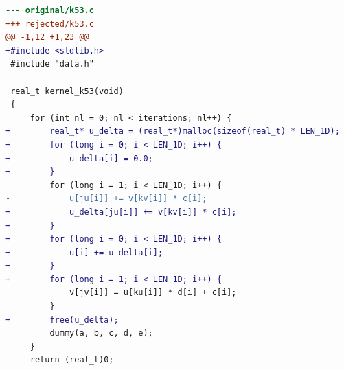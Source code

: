 \begin{lstlisting}[language=diff,basicstyle=\ttfamily\scriptsize,breaklines=true,caption={tsvc_c2/k53 — attempt 2 of 10, rejected by the gate at 'correctness': Program output changed — the patched program is NOT semantically equivalent to the original. / output differs and no numerical slack is in effect}]
--- original/k53.c
+++ rejected/k53.c
@@ -1,12 +1,23 @@
+#include <stdlib.h>
 #include "data.h"
 
 real_t kernel_k53(void)
 {
     for (int nl = 0; nl < iterations; nl++) {
+        real_t* u_delta = (real_t*)malloc(sizeof(real_t) * LEN_1D);
+        for (long i = 0; i < LEN_1D; i++) {
+            u_delta[i] = 0.0;
+        }
         for (long i = 1; i < LEN_1D; i++) {
-            u[ju[i]] += v[kv[i]] * c[i];
+            u_delta[ju[i]] += v[kv[i]] * c[i];
+        }
+        for (long i = 0; i < LEN_1D; i++) {
+            u[i] += u_delta[i];
+        }
+        for (long i = 1; i < LEN_1D; i++) {
             v[jv[i]] = u[ku[i]] * d[i] + c[i];
         }
+        free(u_delta);
         dummy(a, b, c, d, e);
     }
     return (real_t)0;
\end{lstlisting}
